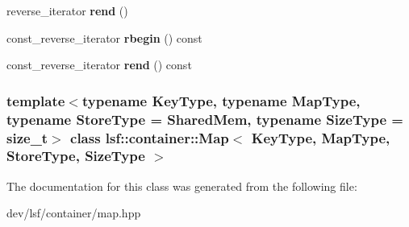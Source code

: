 \begin{DoxyCompactItemize}
\item 
\hypertarget{classlsf_1_1container_1_1Map_ad212a86eb66a12ab2ac93f1267431015}{
reverse\_\-iterator {\bfseries rend} ()}
\label{classlsf_1_1container_1_1Map_ad212a86eb66a12ab2ac93f1267431015}

\item 
\hypertarget{classlsf_1_1container_1_1Map_accf116e00b713a2e89a5dbb3d5ee3a86}{
const\_\-reverse\_\-iterator {\bfseries rbegin} () const }
\label{classlsf_1_1container_1_1Map_accf116e00b713a2e89a5dbb3d5ee3a86}

\item 
\hypertarget{classlsf_1_1container_1_1Map_ab64e8ee2b0e8fa220127c4436ada8cf3}{
const\_\-reverse\_\-iterator {\bfseries rend} () const }
\label{classlsf_1_1container_1_1Map_ab64e8ee2b0e8fa220127c4436ada8cf3}

\end{DoxyCompactItemize}
\subsubsection*{template$<$typename KeyType, typename MapType, typename StoreType = SharedMem, typename SizeType = size\_\-t$>$ class lsf::container::Map$<$ KeyType, MapType, StoreType, SizeType $>$}



The documentation for this class was generated from the following file:\begin{DoxyCompactItemize}
\item 
dev/lsf/container/map.hpp\end{DoxyCompactItemize}
